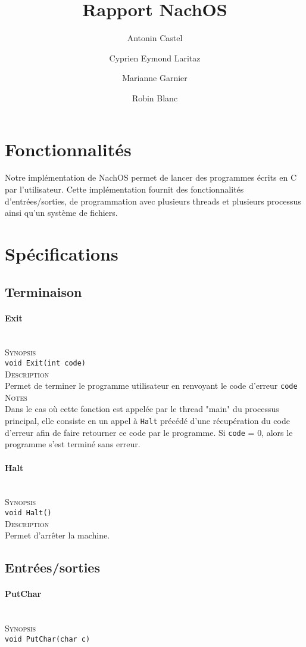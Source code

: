 \documentclass{report}
\title{Rapport NachOS}
\author{Antonin Castel \and
		Cyprien Eymond Laritaz \and
		Marianne Garnier \and
		Robin Blanc}
\newcommand{\myparagraph}[1]{\paragraph*{#1}\mbox{}\\}
\begin{document}
\maketitle

\section*{Fonctionnalités}
Notre implémentation de NachOS permet de lancer des programmes écrits en C par l'utilisateur.
Cette implémentation fournit des fonctionnalités d'entrées/sorties, de programmation avec plusieurs threads et plusieurs processus ainsi qu'un système de fichiers.

\section*{Spécifications}
\subsection*{Terminaison}
\myparagraph{Exit}

\textsc{Synopsis}\\
	\texttt{void Exit(int code)}\\
	
\textsc{Description}\\
	Permet de terminer le programme utilisateur en renvoyant le code d'erreur \texttt{code}\\
	
\textsc{Notes}\\
	Dans le cas où cette fonction est appelée par le thread "main" du processus principal, elle consiste en un appel à \texttt{Halt} précédé d'une récupération du code d'erreur afin de faire retourner ce code par le programme. Si \texttt{code} = 0, alors le programme s'est terminé sans erreur.
		
\myparagraph{Halt}

\textsc{Synopsis}\\
	\texttt{void Halt()}\\
	
\textsc{Description}\\
	Permet d'arrêter la machine.\\

\subsection*{Entrées/sorties}
\myparagraph{PutChar}

\textsc{Synopsis}\\
	\texttt{void PutChar(char c)}\\
	
\end{document}
